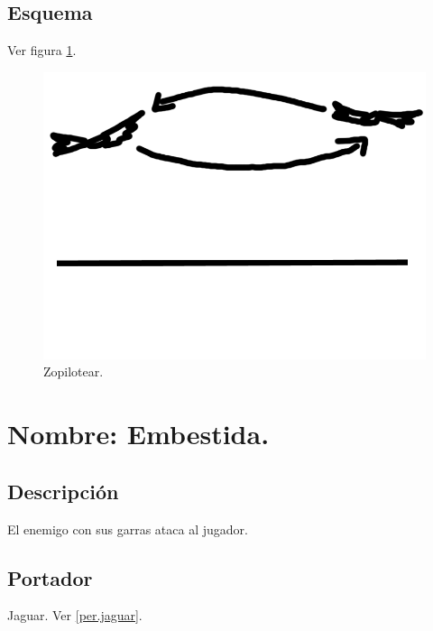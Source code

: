 		\subsection{Esquema}
		Ver figura \ref{fig:zopilotear}.
		\begin{figure}
			\centering
			\includegraphics[height=0.2 \textheight]{Imagenes/zopilotear}
			\caption{Zopilotear.}
			\label{fig:zopilotear}
		\end{figure}

			\section{Nombre: Embestida.} \label{hab.embestida}
			\subsection{Descripción}
			El enemigo con sus garras ataca al jugador.
			\subsection{Portador}
			Jaguar. Ver \ref{per.jaguar}.
